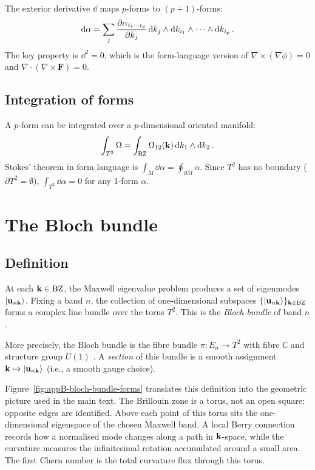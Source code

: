 The exterior derivative $\dd$ maps $p$-forms to $(p+1)$-forms:
\begin{equation}\label{eq:appB-exterior-d}
  \mathrm{d}\alpha = \sum_j\frac{\partial \alpha_{i_1\cdots i_p}}{\partial k_j}\,
  \mathrm{d} k_j\wedge\mathrm{d} k_{i_1}\wedge\cdots\wedge\mathrm{d} k_{i_p}\,.
\end{equation}
The key property is $\dd^2=0$, which is the form-language version of
$\nabla\times(\nabla\phi)=0$ and $\nabla\cdot(\nabla\times\mathbf{F})=0$.

\subsection{Integration of forms}
\label{sec:appB-integration}

A $p$-form can be integrated over a $p$-dimensional oriented manifold:
\begin{equation}\label{eq:appB-integration}
  \int_{T^2}\Omega = \int_{\mathrm{BZ}}\Omega_{12}(\mathbf{k})\,
  \mathrm{d} k_1\wedge\mathrm{d} k_2\,.
\end{equation}
Stokes' theorem in form language is $\int_M\dd\alpha
=\oint_{\partial M}\alpha$.  Since $T^2$ has no boundary
($\partial T^2=\emptyset$), $\int_{T^2}\dd\alpha=0$ for any 1-form
$\alpha$.

\section{The Bloch bundle}
\label{sec:appB-bundle}

\subsection{Definition}
\label{sec:appB-bundle-def}

At each $\mathbf{k}\in\mathrm{BZ}$, the Maxwell eigenvalue problem produces a set of
eigenmodes $|\mathbf{u}_{n\mathbf{k}}\rangle$.  Fixing a band $n$, the
collection of one-dimensional subspaces
$\{|\mathbf{u}_{n\mathbf{k}}\rangle\}_{\mathbf{k}\in\mathrm{BZ}}$ forms a complex line
bundle over the torus $T^2$.  This is the \emph{Bloch bundle} of band
$n$.

More precisely, the Bloch bundle is the fibre bundle
$\pi:E_n\to T^2$ with fibre $\mathbb{C}$ and structure group $U(1)$
\cite{raghu2008analogs,nakahara2018geometry,sergeev2018geometry}.
A \emph{section} of this bundle is a smooth assignment
$\mathbf{k}\mapsto|\mathbf{u}_{n\mathbf{k}}\rangle$ (i.e., a smooth gauge
choice).

Figure~\ref{fig:appB-bloch-bundle-forms} translates this definition
into the geometric picture used in the main text.  The Brillouin zone
is a torus, not an open square: opposite edges are identified.  Above
each point of this torus sits the one-dimensional eigenspace of the
chosen Maxwell band.  A local Berry connection records how a normalised
mode changes along a path in $\mathbf{k}$-space, while the curvature
measures the infinitesimal rotation accumulated around a small area.
The first Chern number is the total curvature flux through this torus.

